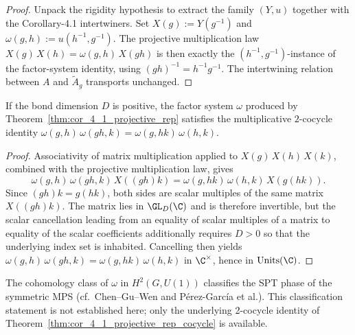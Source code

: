\begin{proof}\leanok
    Unpack the rigidity hypothesis to extract the family
    $(Y, u)$ together with the Corollary-4.1 intertwiners.  Set
    $X(g) := Y(g^{-1})$ and $\omega(g, h) := u(h^{-1}, g^{-1})$.  The
    projective multiplication law $X(g)\, X(h) = \omega(g, h)\, X(gh)$
    is then exactly the $(h^{-1}, g^{-1})$-instance of the factor-system
    identity, using $(gh)^{-1} = h^{-1} g^{-1}$.  The intertwining
    relation between $A$ and $\widetilde{A}_g$ transports unchanged.
\end{proof}

\begin{theorem}%
    \label{thm:cor_4_1_projective_rep_cocycle}
    \leanok
    If the bond dimension $D$ is positive, the factor system $\omega$
    produced by Theorem~\ref{thm:cor_4_1_projective_rep} satisfies the
    multiplicative $2$-cocycle identity
    $\omega(g, h)\, \omega(g h, k) = \omega(g, h k)\, \omega(h, k)$.
\end{theorem}

\begin{proof}\leanok
    Associativity of matrix multiplication applied to
    $X(g)\, X(h)\, X(k)$, combined with the projective multiplication
    law, gives
    \[
        \omega(g, h)\, \omega(g h, k)\, X((g h) k)
        =
        \omega(g, h k)\, \omega(h, k)\, X(g (h k)).
    \]
    Since $(g h) k = g (h k)$, both sides are scalar multiples of the
    same matrix $X((g h) k)$.  The matrix lies in $\GL_D(\C)$ and is
    therefore invertible, but the scalar cancellation leading from an
    equality of scalar multiples of a matrix to equality of the scalar
    coefficients additionally requires $D > 0$ so that the underlying
    index set is inhabited.  Cancelling then yields
    $\omega(g, h)\, \omega(g h, k) = \omega(g, h k)\, \omega(h, k)$
    in $\C^{\times}$, hence in $\mathrm{Units}(\C)$.
\end{proof}

\begin{remark}%
    \label{rem:cor_4_1_projective_rep_spt}
    The cohomology class of $\omega$ in $H^{2}(G, U(1))$ classifies the
    SPT phase of the symmetric MPS (cf.~Chen--Gu--Wen and
    P\'erez-Garc\'ia et al.).  This classification statement is not
    established here; only the underlying 2-cocycle identity of
    Theorem~\ref{thm:cor_4_1_projective_rep_cocycle} is available.
\end{remark}

